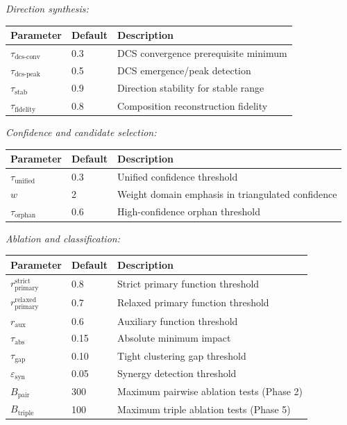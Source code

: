 \documentclass[11pt]{article}
\begin{document}
\noindent\textit{Direction synthesis:}
\begin{center}
\begin{tabular}{llp{}}
\toprule
\textbf{Parameter} & \textbf{Default} & \textbf{Description} \\
\midrule
$\tau_{\text{dcs-conv}}$ & 0.3 & DCS convergence prerequisite minimum \\
$\tau_{\text{dcs-peak}}$ & 0.5 & DCS emergence/peak detection \\
$\tau_{\text{stab}}$ & 0.9 & Direction stability for stable range \\
$\tau_{\text{fidelity}}$ & 0.8 & Composition reconstruction fidelity \\
\bottomrule
\end{tabular}
\end{center}

\noindent\textit{Confidence and candidate selection:}
\begin{center}
\begin{tabular}{llp{}}
\toprule
\textbf{Parameter} & \textbf{Default} & \textbf{Description} \\
\midrule
$\tau_{\text{unified}}$ & 0.3 & Unified confidence threshold \\
$w$ & 2 & Weight domain emphasis in triangulated confidence \\
$\tau_{\text{orphan}}$ & 0.6 & High-confidence orphan threshold \\
\bottomrule
\end{tabular}
\end{center}

\noindent\textit{Ablation and classification:}
\begin{center}
\begin{tabular}{llp{}}
\toprule
\textbf{Parameter} & \textbf{Default} & \textbf{Description} \\
\midrule
$r_{\text{primary}}^{\text{strict}}$ & 0.8 & Strict primary function threshold \\
$r_{\text{primary}}^{\text{relaxed}}$ & 0.7 & Relaxed primary function threshold \\
$r_{\text{aux}}$ & 0.6 & Auxiliary function threshold \\
$\tau_{\text{abs}}$ & 0.15 & Absolute minimum impact \\
$\tau_{\text{gap}}$ & 0.10 & Tight clustering gap threshold \\
$\varepsilon_{\text{syn}}$ & 0.05 & Synergy detection threshold \\
$B_{\text{pair}}$ & 300 & Maximum pairwise ablation tests (Phase 2) \\
$B_{\text{triple}}$ & 100 & Maximum triple ablation tests (Phase 5) \\
\bottomrule
\end{tabular}
\end{center}
\end{document}
